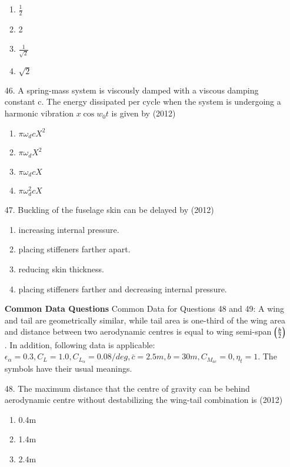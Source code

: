 \documentclass[journal]{IEEEtran}
\begin{document}
\begin{enumerate}
    \begin{enumerate}[label=(\Alph*)]
        \item $\frac{1}{2}$
        \item 2
        \item $\frac{1}{\sqrt{2}}$
        \item $\sqrt{2}$
    \end{enumerate}
    \item[46.] A spring-mass system is viscously damped with a viscous damping constant c. The energy
    dissipated per cycle when the system is undergoing a harmonic vibration $x\cos w_0t$ is given by \hfill (2012)
    \begin{enumerate}[label=(\Alph*)]
        \item $\pi\omega_dcX^2$
        \item $\pi\omega_dX^2$
        \item $\pi\omega_dcX$
        \item $\pi\omega_d^2cX$
    \end{enumerate}
    \item[47.] Buckling of the fuselage skin can be delayed by \hfill (2012)
    \begin{enumerate}[label=(\Alph*)]
        \item  increasing internal pressure. 
        \item placing stiffeners farther apart. 
        \item  reducing skin thickness. 
        \item  placing stiffeners farther and decreasing internal pressure. 
    \end{enumerate} 
    \textbf{Common Data Questions}
    Common Data for Questions 48 and 49:
    A wing and tail are geometrically similar, while tail area is one-third of the wing area and distance between
two aerodynamic centres is equal to wing semi-span $\left(\frac{b}{2}\right)$. In addition, following data is applicable: 
$\epsilon_{\alpha}=0.3,C_L = 1.0,C_{L_{\alpha}} = 0.08/deg, \bar{c}=2.5m, b=30m,C_{M_{ac}}=0, \eta_t = 1$. The symbols have their usual meanings.
    \item[48.] The maximum distance that the centre of gravity can be behind aerodynamic centre without
    destabilizing the wing-tail combination is     \hfill (2012)
    \begin{enumerate}[label=(\Alph*)]
        \item 0.4m
        \item 1.4m
        \item 2.4m

\end{enumerate}
\end{enumerate}
\end{document}
